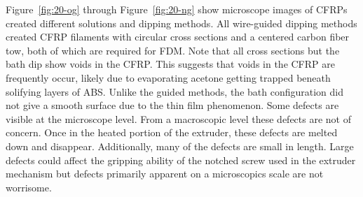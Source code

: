 
Figure~\ref{fig:20-og} through Figure~\ref{fig:20-ng} show microscope images of CFRPs created different solutions and dipping methods. All wire-guided dipping methods created CFRP filaments with circular cross sections and a centered carbon fiber tow, both of which are required for FDM. Note that all cross sections but the bath dip show voids in the CFRP. This suggests that voids in the CFRP are frequently occur, likely due to evaporating acetone getting trapped beneath solifying layers of ABS.  Unlike the guided methods, the bath configuration did not give a smooth surface due to the thin film phenomenon. Some defects are visible at the microscope level. From a macroscopic  level these defects are not of concern. Once in the heated portion of the extruder, these defects are melted down and disappear. Additionally, many of the defects are small in length. Large defects could affect the gripping ability of the notched screw used in the extruder mechanism but defects primarily apparent on a microscopics scale are not worrisome.\\


